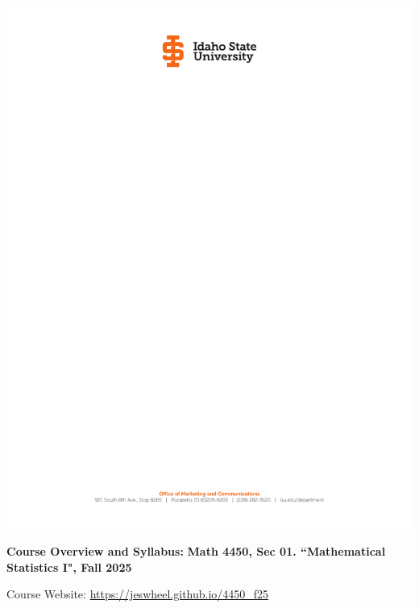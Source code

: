 \documentclass[11pt]{article}\usepackage[]{graphicx}\usepackage[]{xcolor}
\begin{document}



\rule{0cm}{0.3cm}

\vspace{-8mm}

\includegraphics[width=\textwidth,trim={0 25.2cm 0 1.6cm},clip]{ISUletterhead2025.pdf}


\begin{center}
{\bf \LARGE Course Overview and Syllabus:}
{\bf \LARGE Math 4450, Sec 01. ``Mathematical Statistics I", Fall 2025}
\end{center}

\vspace{3mm}

Course Website: \href{https://jeswheel.github.io/4450\_f25}{https://jeswheel.github.io/4450\_f25}
\end{document}
